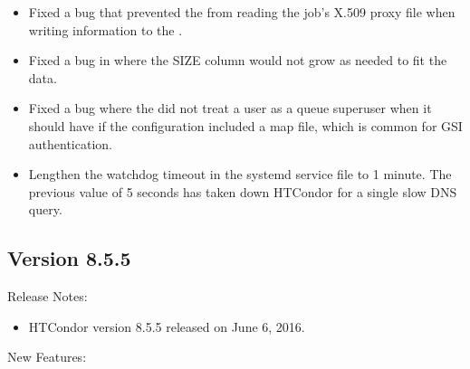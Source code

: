 \begin{itemize}
\item Fixed a bug that prevented the  from reading the
job's X.509 proxy file when writing information to the
.

\item Fixed a bug in  where the SIZE column would not grow as needed to fit the data.

\item Fixed a bug where the  did not treat a user as a queue superuser when it
should have if the configuration included a map file, which is common for GSI authentication.

\item Lengthen the watchdog timeout in the systemd service file to 1 minute.
The previous value of 5 seconds has taken down HTCondor for a single slow DNS
query.

\end{itemize}

\subsection*{\label{sec:New-8-5-5}Version 8.5.5}

\noindent Release Notes:

\begin{itemize}

\item HTCondor version 8.5.5 released on June 6, 2016.

\end{itemize}


\noindent New Features:

